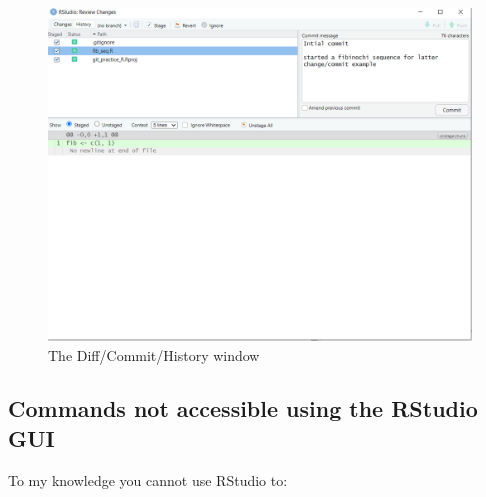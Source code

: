 \documentclass[
  letterpaper,
  DIV=11,
  numbers=noendperiod]{scrreprt}
\begin{document}
\begin{figure}

{\centering \includegraphics{Rstudio_commit.PNG}

}

\caption{The Diff/Commit/History window}

\end{figure}

\hypertarget{commands-not-accessible-using-the-rstudio-gui}{%
\subsection{Commands not accessible using the RStudio
GUI}\label{commands-not-accessible-using-the-rstudio-gui}}

To my knowledge you cannot use RStudio to:
\end{document}
